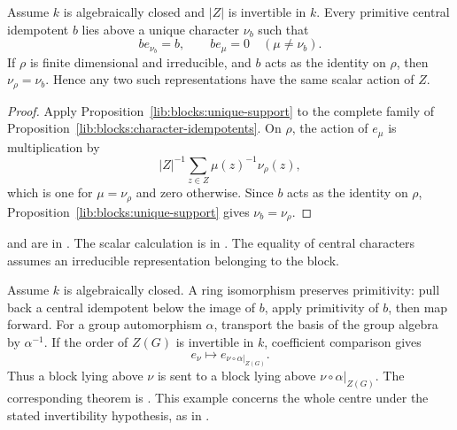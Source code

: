 \begin{proposition}
\label{lib:blocks:sector}
Assume $k$ is algebraically closed and $|Z|$ is invertible in $k$.
Every primitive central idempotent $b$ lies above a unique character $\nu_b$
such that
\[
 be_{\nu_b}=b,\qquad be_\mu=0\quad(\mu\ne\nu_b).
\]
If $\rho$ is finite dimensional and irreducible, and $b$ acts as the
identity on $\rho$, then $\nu_\rho=\nu_b$. Hence any two such
representations have the same scalar action of $Z$.
\end{proposition}
\begin{proof}
Apply Proposition~\ref{lib:blocks:unique-support} to the complete
family of Proposition~\ref{lib:blocks:character-idempotents}.
On $\rho$, the action of $e_\mu$ is multiplication by
\[
 |Z|^{-1}\sum_{z\in Z}\mu(z)^{-1}\nu_\rho(z),
\]
which is one for $\mu=\nu_\rho$ and zero otherwise. Since $b$ acts as
the identity on $\rho$, Proposition~\ref{lib:blocks:unique-support}
gives $\nu_b=\nu_\rho$.
\end{proof}

\begin{implementation}
and 
are in .
The scalar calculation is in .
The equality of central characters assumes an irreducible representation
belonging to the block.
\end{implementation}

\begin{example}
Assume $k$ is algebraically closed. A ring isomorphism preserves
primitivity: pull back a central idempotent
below the image of $b$, apply primitivity of $b$, then map forward.
For a group automorphism $\alpha$, transport the basis of the group algebra by
$\alpha^{-1}$. If the order of $Z(G)$ is invertible in $k$, coefficient
comparison gives
\[
 e_\nu\longmapsto e_{\nu\circ\alpha|_{Z(G)}}.
\]
Thus a block lying above $\nu$ is sent to a block lying above
$\nu\circ\alpha|_{Z(G)}$. The corresponding theorem is
.
This example concerns the whole centre under the stated invertibility
hypothesis, as in .
\end{example}

